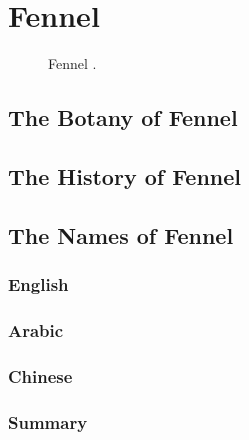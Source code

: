 \section{Fennel}
\label{sec:fennel}



\begin{figure}[!ht]
	\vspace{-4ex}
	\centering
	\caption{Fennel \taxon{}.}
	\label{fig:fennel_imgs}
\end{figure}

\subsection{The Botany of Fennel}

\subsection{The History of Fennel}

\subsection{The Names of Fennel}

\subsubsection{English}





\subsubsection{Arabic}



\subsubsection{Chinese}



\subsubsection{Summary}

